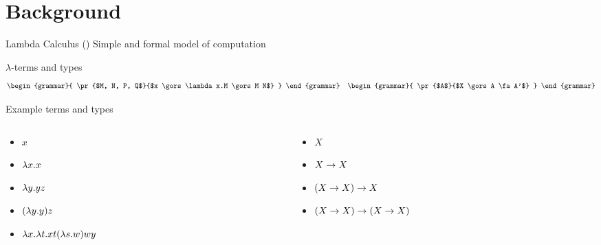\documentclass{beamer}
\theoremstyle{definition}
\begin{document}
  \section{Background}
  \begin{frame}{Lambda Calculus (\lc)}
    Simple and formal \alert{model of computation}
    \begin{block}{\boldmath${\lambda}$-terms and types}
      \begin{align*}
        \begin{grammar}{
          \pr{$M, N, P, Q$}{$x \gors \lambda x.M \gors M N$}
        }
        \end{grammar}
        \quad 
        \begin{grammar}{
          \pr{$A$}{$X \gors A \fa A'$}
        }
        \end{grammar}
      \end{align*}
    \end{block} \pause
    \begin{block}{Example \alert{terms} and \alert{types}} \pause
      \begin{columns}
        \begin{column}{0.48\textwidth}
          \begin{itemize}
            \item $x$ \pause
            \item $\lambda {x}.{x}$ \pause
            \item $\lambda {y}.{y} z$ \pause
            \item $(\lambda {y}.{y}) z$ \pause
            \item $\lambda {x}.{\lambda {t}.{x t (\lambda {s}.{w})}wy}$ \pause
          \end{itemize}
        \end{column}
        \begin{column}{0.48\textwidth}
          \begin{itemize}
            \item $X$ \pause
            \item $X \to X$\pause
            \item $(X \to X) \to X$\pause
            \item $(X \to X) \to (X \to X)$
          \end{itemize}
        \end{column}
      \end{columns}
    \end{block}
  \end{frame}
\end{document}
